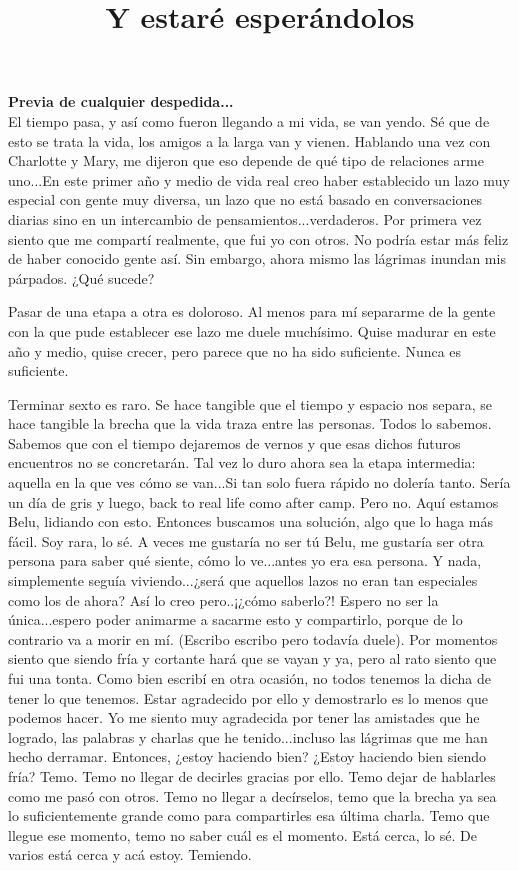 \documentclass[12t, a4 paper]{article}
\title{Y estaré esperándolos  }
\date{}
\begin{document}
\maketitle

\textbf{Previa de cualquier despedida...} \\

El tiempo pasa, y así como fueron llegando a mi vida, se van yendo. Sé que de esto se trata la vida, los amigos a la larga van y vienen. Hablando una vez con Charlotte y Mary, me dijeron que eso depende de qué tipo de relaciones arme uno...En este primer año y medio de vida real creo haber establecido un lazo muy especial con gente muy diversa, un lazo que no está basado en conversaciones diarias sino en un intercambio de pensamientos...verdaderos. Por primera vez siento que me compartí realmente, que fui yo con otros. No podría estar más feliz de haber conocido gente así. Sin embargo, ahora mismo las lágrimas inundan mis párpados. ¿Qué sucede? 

Pasar de una etapa a otra es doloroso. Al menos para mí separarme de la gente con la que pude establecer ese lazo me duele muchísimo. Quise madurar en este año y medio, quise crecer, pero parece que no ha sido suficiente. Nunca es suficiente. 

Terminar sexto es raro. Se hace tangible que el tiempo y espacio nos separa, se hace tangible la brecha que la vida traza entre las personas. Todos lo sabemos. Sabemos que con el tiempo dejaremos de vernos y que esas dichos futuros encuentros no se concretarán. Tal vez lo duro ahora sea la etapa intermedia: aquella en la que ves cómo se van...Si tan solo fuera rápido no dolería tanto. Sería un día de gris y luego, back to real life como after camp. Pero no. Aquí estamos Belu, lidiando con esto. Entonces buscamos una solución, algo que lo haga más fácil. Soy rara, lo sé. A veces me gustaría no ser tú Belu, me gustaría ser otra persona para saber qué siente, cómo lo ve...antes yo era esa persona. Y nada, simplemente seguía viviendo...¿será que aquellos lazos no eran tan especiales como los de ahora? Así lo creo pero..¡¿cómo saberlo?! Espero no ser la única...espero poder animarme a sacarme esto y compartirlo, porque de lo contrario va a morir en mí. (Escribo escribo pero todavía duele). Por momentos siento que siendo fría y cortante hará que se vayan y ya, pero al rato siento que fui una tonta. Como bien escribí en otra ocasión, no todos tenemos la dicha de tener lo que tenemos. Estar agradecido por ello y demostrarlo es lo menos que podemos hacer. Yo me siento muy agradecida por tener las amistades que he logrado, las palabras y charlas que he tenido...incluso las lágrimas que me han hecho derramar. Entonces, ¿estoy haciendo bien? ¿Estoy haciendo bien siendo fría? Temo. Temo no llegar de decirles gracias por ello. Temo dejar de hablarles como me pasó con otros. Temo no llegar a decírselos, temo que la brecha ya sea lo suficientemente grande como para compartirles esa última charla. Temo que llegue ese momento, temo no saber cuál es el momento. Está cerca, lo sé. De varios está cerca y acá estoy. Temiendo. 
\end{document}
